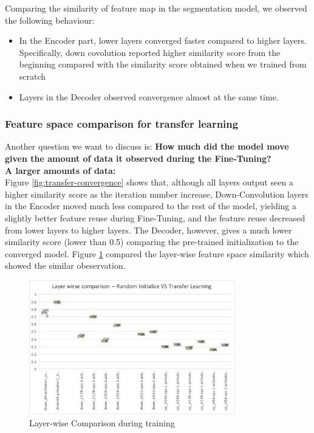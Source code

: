 Comparing the similarity of feature map in the segmentation model, we observed the following behaviour:
\begin{itemize}
	\item In the Encoder part, lower layers converged faster compared to higher layers. Specifically, down covolution reported higher similarity score from the beginning compared with the similarity score obtained when we trained from scratch
	\item Layers in the Decoder observed convergence almost at the same time.
\end{itemize}

\subsubsection{Feature space comparison for transfer learning} %
Another question we want to discuss is: \textbf{How much did the model move given the amount of data it observed during the Fine-Tuning?}\\

\textbf{A larger amounts of data:}\\
Figure \ref{fig:transfer-convergence} shows that, although all layers output seen a higher similarity score as the iteration number increase, 
Down-Convolution layers in the Encoder moved much less compared to the rest of the model, yielding a slightly better feature reuse during Fine-Tuning, and the feature reuse decreased from lower layers to higher layers. The Decoder, however, gives a much lower similarity score (lower than 0.5) comparing the pre-trained initialization to the converged model. Figure \ref{fig:layer-wise-comparison} compared the layer-wise feature space similarity which showed the similar obeservation.

\begin{figure}
	\centering
	\includegraphics[width=0.8\textwidth]{img/SVCCA/randvstansfer-init2converge.png}
	\caption{Layer-wise Comparison during training}
	\label{fig:layer-wise-comparison}
\end{figure}

